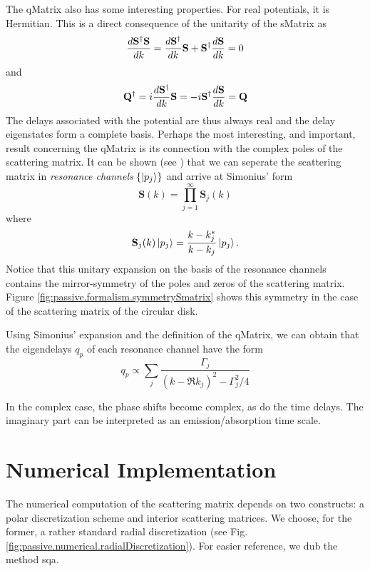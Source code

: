 The \gls{qMatrix} also has some interesting properties. For real
potentials, it is Hermitian. This is a direct consequence of the
unitarity of the \gls{sMatrix} as 
  \begin{equation}
   \frac{d\mathbf{S}^\dagger\mathbf{S}}{dk} = \frac{d\mathbf{S}^\dagger}{dk}\mathbf{S}+\mathbf{S}^\dagger\frac{d\mathbf{S}}{dk} = 0
  \end{equation}
and
  \begin{equation}
   \mathbf{Q}^\dagger = i\frac{d\mathbf{S}^\dagger}{dk}\mathbf{S} = -i\mathbf{S}^\dagger\frac{d\mathbf{S}}{dk} = \mathbf{Q}
  \end{equation}
The delays associated with the potential are thus always real
and the delay eigenstates form a complete basis. Perhaps the
most interesting, and important, result concerning the 
\gls{qMatrix} is its connection with the complex poles of the
scattering matrix. It can be shown (see \cite{SHI2011,SHI2012,GAP2013a})
that we can seperate the scattering matrix in \textit{resonance channels} $\{\ket{p_j}\}$
and arrive at Simonius' form \cite{SIM1974}
  \begin{equation}
   \mathbf{S}(k)=\prod_{j=1}^\infty \mathbf{S}_j(k)
  \end{equation}
where
  \begin{equation}
   \mathbf{S}_j(k)\Ket{p_j} = \frac{k-k_j^*}{k-k_j}\Ket{p_j}.
  \end{equation}
Notice that this unitary expansion on the basis of the resonance
channels contains the mirror-symmetry of the poles and zeros of the 
scattering matrix. Figure \ref{fig:passive.formalism.symmetrySmatrix}
shows this symmetry in the case of the scattering matrix of the circular
disk. 

Using Simonius' expansion and the definition of the \gls{qMatrix}, we can obtain that
the eigendelays $q_p$ of each resonance channel have the form
  \begin{equation}
   \label{eq:passive.formalism.lorentzianDelays}
   q_p \propto \sum_j \frac{\Gamma_j}{\left(k-\Re{k_j}\right)^2-\Gamma_j^2/4}
  \end{equation}

In the complex case, the phase shifts become complex, as do the 
time delays. The imaginary part can be interpreted as an 
emission/absorption time scale.


\section{Numerical Implementation}
The numerical computation of the scattering matrix 
depends on two constructs: a polar discretization 
scheme and interior scattering matrices. We choose, for
the former, a rather standard radial discretization 
(see Fig. \ref{fig:passive.numerical.radialDiscretization}).
For easier reference, we dub the method \gls{sqa}.

